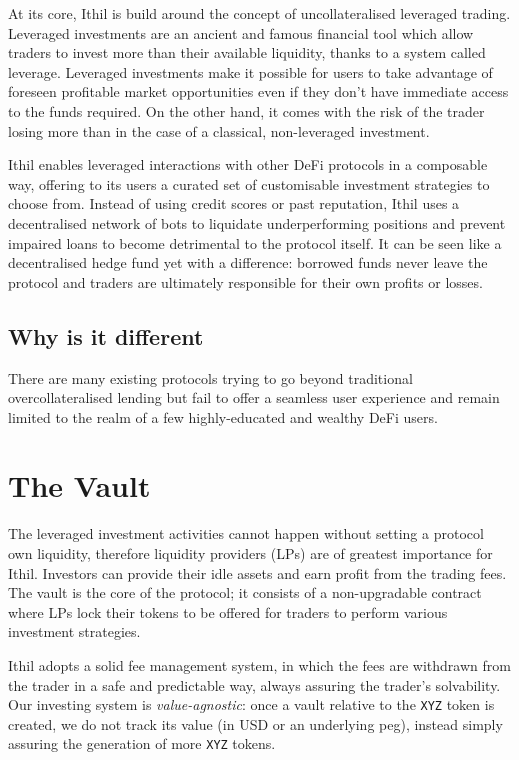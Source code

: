 \documentclass[a4paper,10 pt]{article}
\theoremstyle{definition}
\begin{document}
At its core, Ithil is build around the concept of uncollateralised leveraged trading.
Leveraged investments are an ancient and famous financial tool which allow traders to invest more than their available liquidity, thanks to a system called leverage. Leveraged investments make it possible for users to take advantage of foreseen profitable market opportunities even if they don't have immediate access to the funds required. On the other hand, it comes with the risk of the trader losing more than in the case of a classical, non-leveraged investment.

Ithil enables leveraged interactions with other DeFi protocols in a composable way, offering to its users a curated set of customisable investment strategies to choose from. Instead of using credit scores or past reputation, Ithil uses a decentralised network of bots to liquidate underperforming positions and prevent impaired loans to become detrimental to the protocol itself.
It can be seen like a decentralised hedge fund yet with a difference: borrowed funds never leave the protocol and traders are ultimately responsible for their own profits or losses.

\subsection{Why is it different}
There are many existing protocols trying to go beyond traditional overcollateralised lending but fail to offer a seamless user experience and remain limited to the realm of a few highly-educated and wealthy DeFi users.

\section{The Vault}
The leveraged investment activities cannot happen without setting a protocol own liquidity, therefore liquidity providers (LPs) are of greatest importance for Ithil. Investors can provide their idle assets and earn profit from the trading fees.
The vault is the core of the protocol; it consists of a non-upgradable contract where LPs lock their tokens to be offered for traders to perform various investment strategies.

Ithil adopts a solid fee management system, in which the fees are withdrawn from the trader in a safe and predictable way, always assuring the trader's solvability.
Our investing system is \textit{value-agnostic}: once a vault relative to the \verb|XYZ| token is created, we do not track its value (in USD or an underlying peg), instead simply assuring the generation of more \verb|XYZ| tokens.
\end{document}
